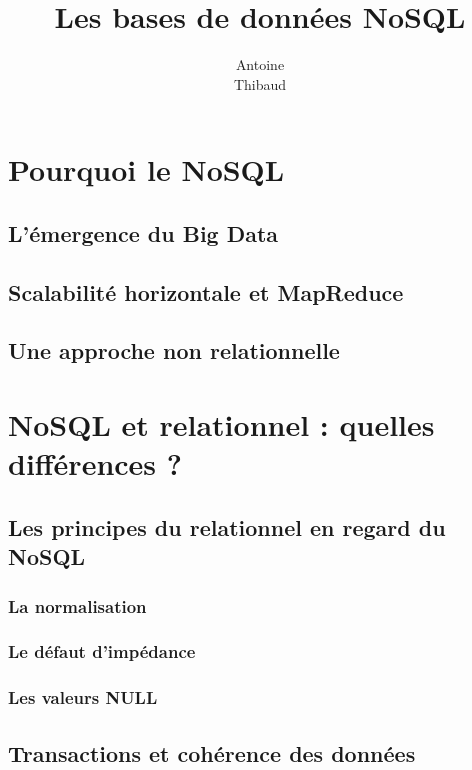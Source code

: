 \documentclass[12pt,titlepage,a4paper]{report}
\title{Les bases de données NoSQL}
\author{Antoine \bsc{Augusti}\\ Thibaud \bsc{Dauce}}
\begin{document}
	\dominitoc
	\tableofcontents

	\chapter{Pourquoi le NoSQL}
	\minitoc

		\section{L'émergence du Big Data}
		

		\section{Scalabilité horizontale et MapReduce}
		

		\section{Une approche non relationnelle}
			

	\chapter{NoSQL et relationnel : quelles différences ?}
	\minitoc

		\section{Les principes du relationnel en regard du NoSQL}
			\subsection{La normalisation}
			\subsection{Le défaut d'impédance}
			\subsection{Les valeurs NULL}

		\section{Transactions et cohérence des données}
\end{document}

